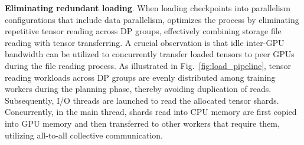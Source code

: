\noindent \textbf{Eliminating redundant loading}.
When loading checkpoints into parallelism configurations that include data parallelism, \sys{} optimizes the process by eliminating repetitive tensor reading across DP groups, effectively combining storage file reading with tensor transferring. A crucial observation is that idle inter-GPU bandwidth can be utilized to concurrently transfer loaded tensors to peer GPUs during the file reading process. As illustrated in Fig.~\ref{fig:load_pipeline}, tensor reading workloads across DP groups are evenly distributed among training workers during the planning phase, thereby avoiding duplication of reads. Subsequently, I/O threads are launched to read the allocated tensor shards. Concurrently, in the main thread, shards read into CPU memory are first copied into GPU memory and then transferred to other workers that require them, utilizing all-to-all collective communication. 



